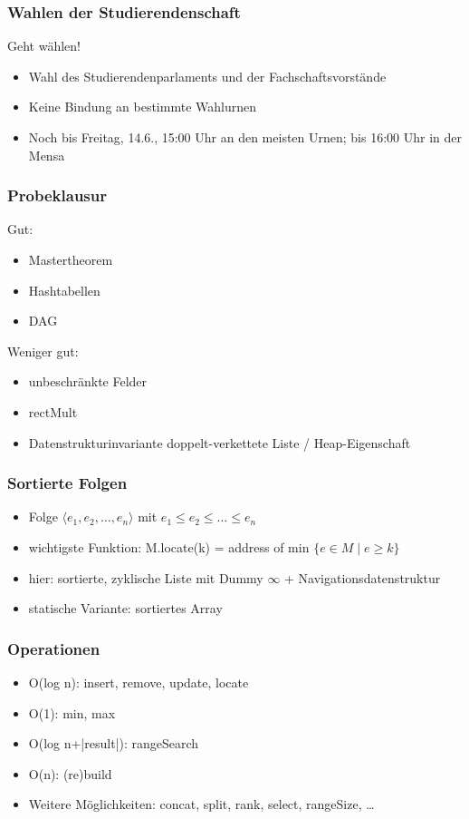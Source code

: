 

\begin{frame}
  \titlepage
\end{frame}

\begin{frame}
\frametitle{Wahlen der Studierendenschaft}
Geht wählen!
\begin{itemize}
\item Wahl des Studierendenparlaments und der Fachschaftsvorstände
\item Keine Bindung an bestimmte Wahlurnen
\item Noch bis Freitag, 14.6., 15:00 Uhr an den meisten Urnen; bis 16:00 Uhr in der Mensa
\end{itemize}
\end{frame}

\begin{frame}
\frametitle{Probeklausur}
Gut:
\begin{itemize}
\item Mastertheorem
\item Hashtabellen
\item DAG
\end{itemize}
Weniger gut:
\begin{itemize}
\item unbeschränkte Felder
\item rectMult
\item Datenstrukturinvariante doppelt-verkettete Liste / Heap-Eigenschaft
\end{itemize}
\end{frame}

\begin{frame}
\frametitle{Sortierte Folgen}
\begin{itemize}
\item Folge $\langle e_1,e_2,\ldots,e_n\rangle$ mit $e_1\leq e_2\leq \ldots\leq e_n$\pause
\item wichtigste Funktion: M.locate(k) = address of min $\{e\in M\mid e\geq k\}$\pause
\item hier: sortierte, zyklische Liste mit Dummy $\infty$ + Navigationsdatenstruktur\pause
\item statische Variante: sortiertes Array
\end{itemize}
\end{frame}

\begin{frame}
\frametitle{Operationen}
\begin{itemize}
\item O(log n): insert, remove, update, locate
\item O(1): min, max
\item O(log n+|result|): rangeSearch
\item O(n): (re)build\pause
\item Weitere Möglichkeiten: concat, split, rank, select, rangeSize, \ldots
\end{itemize}
\end{frame}

